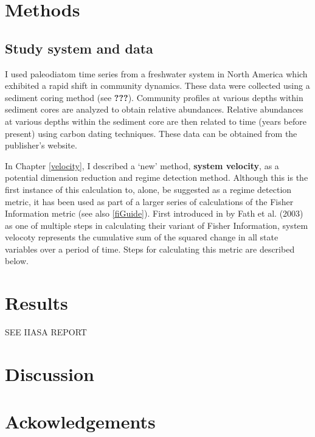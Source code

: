\documentclass[12pt,twoside,openany]{reedthesis}
\begin{document}
\hypertarget{methods-1}{%
\section{Methods}\label{methods-1}}

\hypertarget{study-system-and-data}{%
\subsection{Study system and data}\label{study-system-and-data}}

I used paleodiatom time series from a freshwater system in North America which exhibited a rapid shift in community dynamics. These data were collected using a sediment coring method (see {\textbf{???}}). Community profiles at various depths within sediment cores are analyzed to obtain relative abundances. Relative abundances at various depths within the sediment core are then related to time (years before present) using carbon dating techniques. These data can be obtained from the publisher's website.

In Chapter \ref{velocity}, I described a `new' method, \textbf{system velocity}, as a potential dimension reduction and regime detection method. Although this is the first instance of this calculation to, alone, be suggested as a regime detection metric, it has been used as part of a larger series of calculations of the Fisher Information metric (see also \ref{fiGuide}). First introduced in by Fath et al. (2003) as one of multiple steps in calculating their variant of Fisher Information, system velocoty represents the cumulative sum of the squared change in all state variables over a period of time. Steps for calculating this metric are described below.

\hypertarget{results-2}{%
\section{Results}\label{results-2}}

SEE IIASA REPORT

\hypertarget{discussion-2}{%
\section{Discussion}\label{discussion-2}}

\hypertarget{ackowledgements}{%
\section{Ackowledgements}\label{ackowledgements}}
\end{document}
